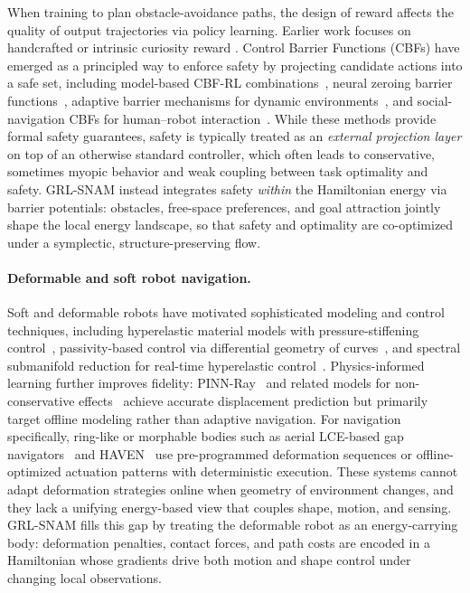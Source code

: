 When training to plan obstacle-avoidance paths, the design of reward affects the quality of output trajectories via policy learning. Earlier work focuses on handcrafted or intrinsic curiosity reward \citep{tai2017virtual, Lei2018curiosity}. Control Barrier Functions (CBFs) have emerged as a principled way to enforce safety by projecting candidate actions into a safe set, including model-based CBF-RL combinations~\citep{li2023imagination}, neural zeroing barrier functions~\citep{feng2023safer}, adaptive barrier mechanisms for dynamic environments~\citep{sac2025barrier}, and social-navigation CBFs for human--robot interaction~\citep{social2024barrier}. While these methods provide formal safety guarantees, safety is typically treated as an \emph{external projection layer} on top of an otherwise standard controller, which often leads to conservative, sometimes myopic behavior and weak coupling between task optimality and safety. GRL-SNAM instead integrates safety \emph{within} the Hamiltonian energy via barrier potentials: obstacles, free-space preferences, and goal attraction jointly shape the local energy landscape, so that safety and optimality are co-optimized under a symplectic, structure-preserving flow.

\paragraph{Deformable and soft robot navigation.}
Soft and deformable robots have motivated sophisticated modeling and control techniques, including hyperelastic material models with pressure-stiffening control~\citep{roshanfar2023hyperelastic}, passivity-based control via differential geometry of curves~\citep{caasenbrood2022control}, and spectral submanifold reduction for real-time hyperelastic control~\citep{nature2025discovering}. Physics-informed learning further improves fidelity: PINN-Ray~\citep{wang2024pinn} and related models for non-conservative effects~\citep{liu2024physics} achieve accurate displacement prediction but primarily target offline modeling rather than adaptive navigation. For navigation specifically, ring-like or morphable bodies such as aerial LCE-based gap navigators~\citep{qi2024aerial} and HAVEN~\citep{haven2024haptic} use pre-programmed deformation sequences or offline-optimized actuation patterns with deterministic execution. These systems cannot adapt deformation strategies online when geometry of environment changes, and they lack a unifying energy-based view that couples shape, motion, and sensing. GRL-SNAM fills this gap by treating the deformable robot as an energy-carrying body: deformation penalties, contact forces, and path costs are encoded in a Hamiltonian whose gradients drive both motion and shape control under changing local observations.

